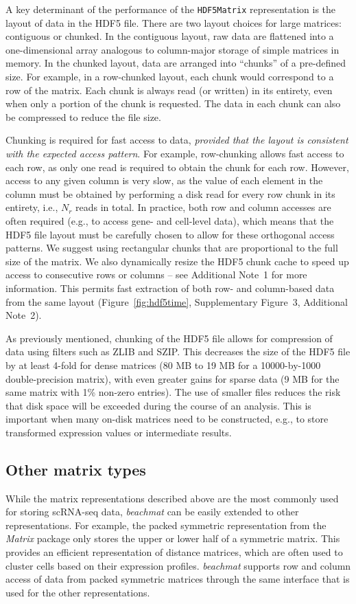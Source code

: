 \documentclass[10pt,letterpaper]{article}
\newcommand{\beachmat}{\textit{beachmat}}
\newcommand{\code}[1]{\texttt{#1}}
\newcommand{\suppfighdflayout}{3}
\newcommand{\suppseclayouttest}{2}
\begin{document}
A key determinant of the performance of the \code{HDF5Matrix} representation is the layout of data in the HDF5 file.
There are two layout choices for large matrices: contiguous or chunked.
In the contiguous layout, raw data are flattened into a one-dimensional array analogous to column-major storage of simple matrices in memory.
In the chunked layout, data are arranged into ``chunks'' of a pre-defined size.
For example, in a row-chunked layout, each chunk would correspond to a row of the matrix.
Each chunk is always read (or written) in its entirety, even when only a portion of the chunk is requested.
The data in each chunk can also be compressed to reduce the file size.

Chunking is required for fast access to data, \textit{provided that the layout is consistent with the expected access pattern}.
For example, row-chunking allows fast access to each row, as only one read is required to obtain the chunk for each row.
However, access to any given column is very slow, as the value of each element in the column must be obtained by performing a disk read for every row chunk in its entirety, i.e., $N_r$ reads in total.
In practice, both row and column accesses are often required (e.g., to access gene- and cell-level data), which means that the HDF5 file layout must be carefully chosen to allow for these orthogonal access patterns.
We suggest using rectangular chunks that are proportional to the full size of the matrix.
We also dynamically resize the HDF5 chunk cache to speed up access to consecutive rows or columns -- see Additional Note~1 for more information.
This permits fast extraction of both row- and column-based data from the same layout (Figure~\ref{fig:hdf5time}, Supplementary Figure~\suppfighdflayout{}, Additional Note~\suppseclayouttest{}).

As previously mentioned, chunking of the HDF5 file allows for compression of data using filters such as ZLIB and SZIP.
This decreases the size of the HDF5 file by at least 4-fold for dense matrices (80 MB to 19 MB for a 10000-by-1000 double-precision matrix), with even greater gains for sparse data (9 MB for the same matrix with 1\% non-zero entries).
The use of smaller files reduces the risk that disk space will be exceeded during the course of an analysis.
This is important when many on-disk matrices need to be constructed, e.g., to store transformed expression values or intermediate results.

\subsection*{Other matrix types}
While the matrix representations described above are the most commonly used for storing scRNA-seq data, \beachmat{} can be easily extended to other representations.
For example, the packed symmetric representation from the \textit{Matrix} package only stores the upper or lower half of a symmetric matrix.
This provides an efficient representation of distance matrices, which are often used to cluster cells based on their expression profiles.
\beachmat{} supports row and column access of data from packed symmetric matrices through the same interface that is used for the other representations.
\end{document}
